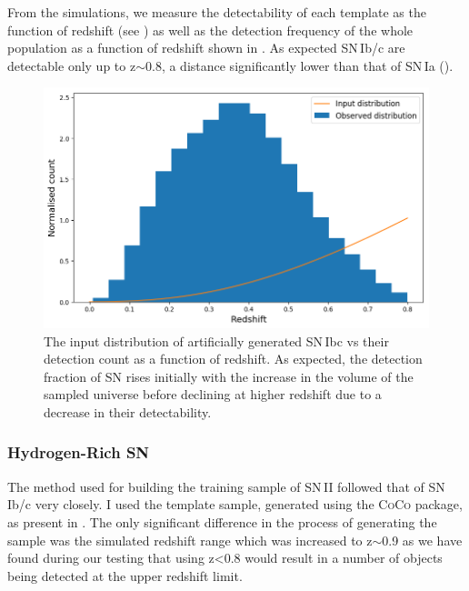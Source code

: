 From the simulations, we measure the detectability of each template as the function of redshift (see ) as well as the detection frequency of the whole population as a function of redshift shown in . As expected SN\,Ib/c are detectable only up to z$\sim$0.8, a distance significantly lower than that of SN\,Ia ().

\begin{figure}
  \includegraphics[width=\textwidth]{Figures/Chapter5/SNIbc_z_dist.png}
  \caption{The input distribution of artificially generated SN\,Ibc vs their detection count as a function of redshift. As expected, the detection fraction of SN rises initially with the increase in the volume of the sampled universe before declining at higher redshift due to a decrease in their detectability.}
  \label{fig:IbcDist}
\end{figure}

\subsubsection{Hydrogen-Rich SN}
The method used for building the training sample of SN\,II followed that of SN\,Ib/c very closely. I used the template sample, generated using the \textsc{CoCo} package, as present in . The only significant difference in the process of generating the sample was the simulated redshift range which was increased to z$\sim$0.9 as we have found during our testing that using z<0.8 would result in a number of objects being detected at the upper redshift limit.

